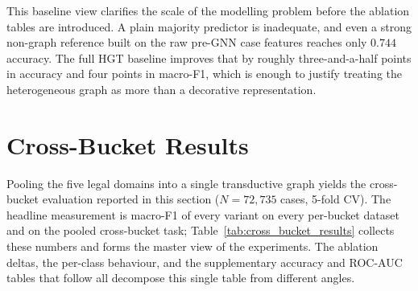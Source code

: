 {This baseline view clarifies the scale of the modelling
problem before the ablation tables are introduced. A plain majority
predictor is inadequate, and even a strong non-graph reference built on
the raw pre-GNN case features reaches only $0.744$ accuracy. The full
HGT baseline improves that by roughly three-and-a-half points in
accuracy and four points in macro-F1, which is enough to justify
treating the heterogeneous graph as more than a decorative
representation.\par}

\section{Cross-Bucket Results}
\label{sec:main_results}

Pooling the five legal domains into a single transductive graph
yields the cross-bucket evaluation reported in this section
($N\!=\!72{,}735$ cases, 5-fold CV). The headline measurement is
macro-F1 of every variant on every per-bucket dataset and on the
pooled cross-bucket task; Table~\ref{tab:cross_bucket_results}
collects these numbers and forms the master view of the experiments.
The ablation deltas, the per-class behaviour, and the supplementary
accuracy and ROC-AUC tables that follow all decompose this single
table from different angles.

